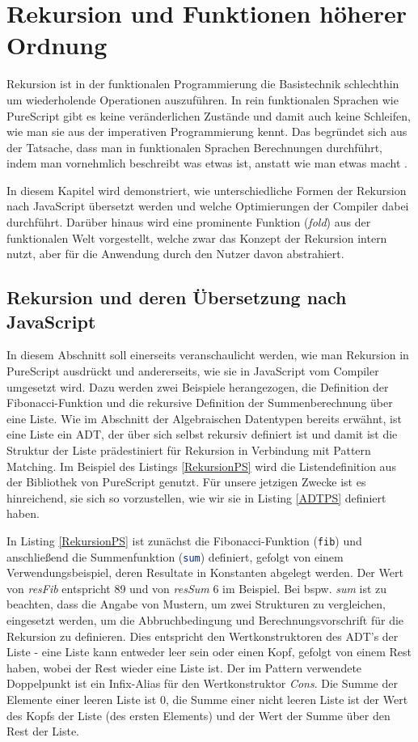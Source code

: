 \documentclass[
12pt,
ngerman,
oneside]
{scrbook} %
\begin{document}
\chapter{Rekursion und Funktionen höherer Ordnung}
Rekursion ist in der funktionalen Programmierung die Basistechnik schlechthin um wiederholende Operationen auszuführen. In rein funktionalen Sprachen wie PureScript gibt es keine veränderlichen Zustände und damit auch keine Schleifen, wie man sie aus der imperativen Programmierung kennt. Das begründet sich aus der Tatsache, dass man in funktionalen Sprachen Berechnungen durchführt, indem man vornehmlich beschreibt was etwas ist, anstatt wie man etwas macht \cite[][S. 31--32]{Freeman17}. 

In diesem Kapitel wird demonstriert, wie unterschiedliche Formen der Rekursion nach JavaScript übersetzt werden und welche Optimierungen der Compiler dabei durchführt. Darüber hinaus wird eine prominente Funktion (\emph{fold}) aus der funktionalen Welt vorgestellt, welche zwar das Konzept der Rekursion intern nutzt, aber für die Anwendung durch den Nutzer davon abstrahiert.

\section{Rekursion und deren Übersetzung nach JavaScript}
In diesem Abschnitt soll einerseits veranschaulicht werden, wie man Rekursion in PureScript ausdrückt und andererseits, wie sie in JavaScript vom Compiler umgesetzt wird. Dazu werden zwei Beispiele herangezogen, die Definition der Fibonacci-Funktion und die rekursive Definition der Summenberechnung über eine Liste. Wie im Abschnitt der Algebraischen Datentypen bereits erwähnt, ist eine Liste ein ADT, der über sich selbst rekursiv definiert ist und damit ist die Struktur der Liste prädestiniert für Rekursion in Verbindung mit Pattern Matching. Im Beispiel des Listings \ref{RekursionPS} wird die Listendefinition aus der Bibliothek von PureScript genutzt. Für unsere jetzigen Zwecke ist es hinreichend, sie sich so vorzustellen, wie wir sie in Listing \ref{ADTPS} definiert haben.

In Listing \ref{RekursionPS} ist zunächst die Fibonacci-Funktion (\lstinline[language=purescript, columns=fixed]{fib}) und anschließend die Summenfunktion (\lstinline[language=purescript, columns=fixed]{sum}) definiert, gefolgt von einem Verwendungsbeispiel, deren Resultate in Konstanten abgelegt werden. Der Wert von \emph{resFib} entspricht 89 und von \emph{resSum} 6 im Beispiel. Bei bspw. \emph{sum} ist zu beachten, dass die Angabe von Mustern, um zwei Strukturen zu vergleichen, eingesetzt werden, um die Abbruchbedingung und Berechnungsvorschrift für die Rekursion zu definieren. Dies entspricht den Wertkonstruktoren des ADT's der Liste - eine Liste kann entweder leer sein oder einen Kopf, gefolgt von einem Rest haben, wobei der Rest wieder eine Liste ist. Der im Pattern verwendete Doppelpunkt ist ein Infix-Alias für den Wertkonstruktor \emph{Cons}. Die Summe der Elemente einer leeren Liste ist 0, die Summe einer nicht leeren Liste ist der Wert des Kopfs der Liste (des ersten Elements) und der Wert der Summe über den Rest der Liste.
\end{document}
